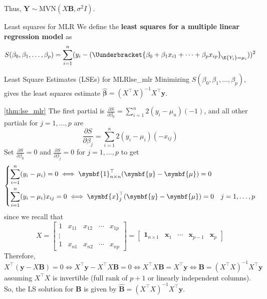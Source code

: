 Thus, $ \symbf{Y}\sim \text{MVN}(X\symbf{B},\sigma^2 I) $.
\begin{Definition}{Least squares for MLR}{}
    We define the \textbf{least squares for a multiple linear regression model}
    as
    \[ S(\beta_0,\beta_1,\ldots,\beta_p)
        =\sum\limits_{i=1}^{n}
        (y_i-(\Uunderbracket{
            \beta_0+\beta_1 x_{i1}+\cdots+\beta_p x_{ip}
        }_{\E{Y_i}=\mu_i}))^2
    \]
\end{Definition}
\begin{Theorem}{Least Square Estimates (LSEs) for MLR}{lse_mlr}
    Minimizing $ S(\beta_0,\beta_1,\ldots,\beta_p) $, gives the least squares
    estimate $ \hat{\symbf{\beta}}=(X^\top X)^{-1}X^\top\symbf{y} $.
\end{Theorem}
\begin{Proof}{\ref{thm:lse_mlr}}{}
    The first partial is $ \frac{\partial S}{\partial \beta_0}=\sum\limits_{i=1}^{n} 2(y_i-\mu_u)(-1) $,
    and all other partials for $ j=1,\ldots,p $ are
    \[ \dfrac{\partial S}{\partial \beta_j}=
        \sum\limits_{i=1}^{n} 2(y_i-\mu_i)(-x_{i j}) \]
    Set $ \displaystyle \frac{\partial S}{\partial \beta_0}=0 $
    and $ \displaystyle \frac{\partial S}{\partial \beta_j}=0 $ for $ j=1,\ldots,p $
    to get
    \[ \begin{dcases}
            \sum\limits_{i=1}^{n} (y_i-\mu_i)=0\iff \symbf{1}_{n\times n}^\top(\symbf{y}-\symbf{\mu})=0 \\
            \sum\limits_{i=1}^{n} (y_i-\mu_i)x_{i j}=0\iff \symbf{x}_{j}^\top
            (\symbf{y}-\symbf{\mu})=0 & j=1,\ldots,p
        \end{dcases} \]
    since we recall that
    \[ X=\begin{bmatrix}
            1 & x_{11} & x_{12} & \cdots & x_{1p}  \\
            \vdots                                 \\
            1 & x_{n1} & x_{n2} & \cdots & x_{n p}
        \end{bmatrix}=
        \begin{bmatrix}
            \symbf{1}_{n\times 1} & \symbf{x}_1 & \cdots & \symbf{x}_{p-1} & \symbf{x}_p
        \end{bmatrix} \]
    Therefore,
    \[ X^\top(\symbf{y}-X\symbf{B})=0\iff
        X^\top \symbf{y}-X^\top X\symbf{B}=0\iff
        X^\top X \symbf{B}=X^\top \symbf{y}\iff
        \symbf{B}=(X^\top X)^{-1}X^\top \symbf{y} \]
    assuming $ X^\top X $ is invertible (full rank of $ p+1 $ or linearly
    independent columns). So, the LS solution for $ \symbf{B} $ is given by
    $ \hat{\symbf{B}}=(X^\top X)^{-1}X^\top \symbf{y} $.
\end{Proof}
